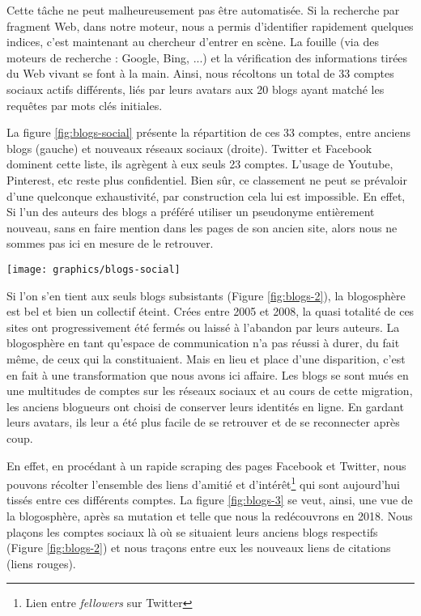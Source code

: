 \documentclass[symmetric,justified,marginals=raggedouter]{tufte-book}
\begin{document}
Cette tâche ne peut malheureusement pas être automatisée. Si la recherche par fragment Web, dans notre moteur, nous a permis d'iden\-tifier rapidement quelques indices, c'est maintenant au chercheur d'en\-trer en scène. La fouille (via des moteurs de recherche : Google, Bing, ...) et la vérification des informations tirées du Web vivant se font à la main. Ainsi, nous récoltons un total de 33 comptes sociaux actifs différents, liés par leurs avatars aux 20 blogs ayant matché les requêtes par mots clés initiales. 

La figure \ref{fig:blogs-social} présente la répartition de ces 33 comptes, entre anciens blogs (gauche) et nouveaux réseaux sociaux (droite). Twitter et Facebook dominent cette liste, ils agrègent à eux seuls 23 comptes. L'usage de Youtube, Pinterest, etc reste plus confidentiel. Bien sûr, ce classement ne peut  se prévaloir d'une quelconque exhaustivité, par construction cela lui est impossible. En effet, Si l'un des auteurs des blogs a préféré utiliser un pseudonyme entièrement nouveau, sans en faire mention dans les pages de son ancien site, alors nous ne sommes pas ici en mesure de le retrouver.

\begin{figure*}
  \texttt{[image: graphics/blogs-social]}
  \caption{Liste des blogs de 2008 liés à des réseaux sociaux en 2018}
  \label{fig:blogs-social}
\end{figure*} 

\noindent Si l'on s'en tient aux seuls blogs subsistants (Figure \ref{fig:blogs-2}), la blogosphère est bel et bien un collectif éteint. Crées entre 2005 et 2008, la quasi totalité de ces sites ont progressivement été fermés ou laissé à l'abandon par leurs auteurs. La blogosphère en tant qu'espace de communication n'a pas réussi à durer, du fait même, de ceux qui la constituaient. Mais en lieu et place d'une disparition, c'est en fait à une transformation que nous avons ici affaire. Les blogs se sont mués en une multitudes de comptes sur les réseaux sociaux et au cours de cette migration, les anciens blogueurs ont choisi de conserver leurs identités en ligne. En gardant leurs avatars, ils leur a été plus facile de se retrouver et de se reconnecter après coup.

En effet, en procédant à un rapide scraping des pages Facebook et Twitter, nous pouvons récolter l'ensemble des liens d'amitié et d'intérêt\footnote{Lien entre \textit{fellowers} sur Twitter} qui sont aujourd'hui tissés entre ces différents comptes. La figure \ref{fig:blogs-3} se veut, ainsi, une vue de la blogosphère, après sa mutation et telle que nous la redécouvrons en 2018. Nous plaçons les comptes sociaux là où se situaient leurs anciens blogs respectifs (Figure \ref{fig:blogs-2}) et nous traçons entre eux les nouveaux liens de citations (liens rouges).
\end{document}
